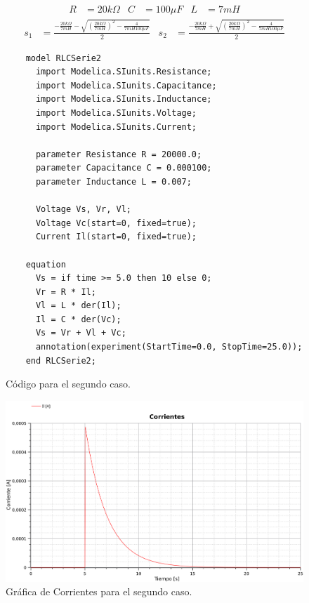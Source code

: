 

\begin{align*}
  R&=20k\Omega&
  C&=100\mu F&
  L&=7mH
\end{align*}
\begin{align*}
  s_1 &= \frac{-\frac{20k\Omega}{7mH}
  - \sqrt{\left(\frac{20k\Omega}{7mH}\right)^2-\frac{4}{7mH100\mu F}}}{2}
  &
  s_2 &= \frac{-\frac{20k\Omega}{7mH}
  + \sqrt{\left(\frac{20k\Omega}{7mH}\right)^2-\frac{4}{7mH100\mu F}}}{2}
\end{align*}


\begin{figure}[H]
  \begin{lstlisting}
    model RLCSerie2
      import Modelica.SIunits.Resistance;
      import Modelica.SIunits.Capacitance;
      import Modelica.SIunits.Inductance;
      import Modelica.SIunits.Voltage;
      import Modelica.SIunits.Current;

      parameter Resistance R = 20000.0;
      parameter Capacitance C = 0.000100;
      parameter Inductance L = 0.007;

      Voltage Vs, Vr, Vl;
      Voltage Vc(start=0, fixed=true);
      Current Il(start=0, fixed=true);

    equation
      Vs = if time >= 5.0 then 10 else 0;
      Vr = R * Il;
      Vl = L * der(Il);
      Il = C * der(Vc);
      Vs = Vr + Vl + Vc;
      annotation(experiment(StartTime=0.0, StopTime=25.0));
    end RLCSerie2;
  \end{lstlisting}
  \caption{Código para el segundo caso.}
\end{figure}

\begin{figure}[H]
  \centering
  \label{gr:caso1:corrientes}
  \includegraphics[width=\textwidth]{modelica/graficas/2-corrientes}
  \caption{Gráfica de Corrientes para el segundo caso.}
\end{figure}


